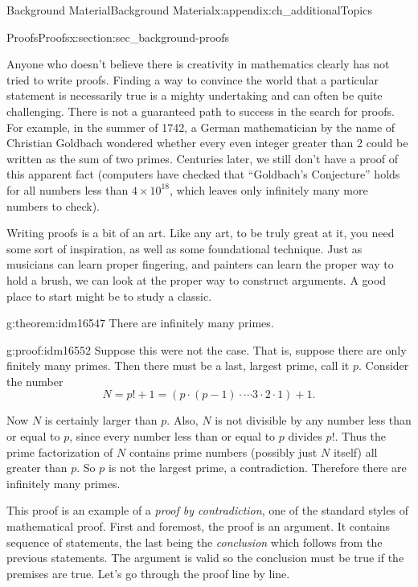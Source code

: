 \documentclass[oneside,10pt,]{book}
\numberwithin{equation}{chapter}
\begin{document}
\begin{appendixptx}{Background Material}{}{Background Material}{}{}{x:appendix:ch_additionalTopics}
\begin{sectionptx}{Proofs}{}{Proofs}{}{}{x:section:sec_background-proofs}
\begin{introduction}{}
Anyone who doesn't believe there is creativity in mathematics clearly has not tried to write proofs. Finding a way to convince the world that a particular statement is necessarily true is a mighty undertaking and can often be quite challenging. There is not a guaranteed path to success in the search for proofs. For example, in the summer of 1742, a German mathematician by the name of Christian Goldbach wondered whether every even integer greater than 2 could be written as the sum of two primes. Centuries later, we still don't have a proof of this apparent fact (computers have checked that ``Goldbach's Conjecture'' holds for all numbers less than \(4\times 10^{18}\), which leaves only infinitely many more numbers to check).%
\par
Writing proofs is a bit of an art. Like any art, to be truly great at it, you need some sort of inspiration, as well as some foundational technique. Just as musicians can learn proper fingering, and painters can learn the proper way to hold a brush, we can look at the proper way to construct arguments. A good place to start might be to study a classic.%
\begin{theorem}{}{}{g:theorem:idm16547}%
There are infinitely many primes.%
\end{theorem}
\begin{proofptx}{}{g:proof:idm16552}
Suppose this were not the case. That is, suppose there are only finitely many primes. Then there must be a last, largest prime, call it \(p\). Consider the number%
\begin{equation*}
N = p! + 1 = (p \cdot (p-1) \cdot \cdots 3\cdot 2 \cdot 1) + 1.
\end{equation*}
%
\par
Now \(N\) is certainly larger than \(p\). Also, \(N\) is not divisible by any number less than or equal to \(p\), since every number less than or equal to \(p\) divides \(p!\). Thus the prime factorization of \(N\) contains prime numbers (possibly just \(N\) itself) all greater than \(p\). So \(p\) is not the largest prime, a contradiction. Therefore there are infinitely many primes.%
\end{proofptx}
This proof is an example of a \emph{proof by contradiction}, one of the standard styles of mathematical proof. First and foremost, the proof is an argument. It contains sequence of statements, the last being the \emph{conclusion} which follows from the previous statements. The argument is valid so the conclusion must be true if the premises are true. Let's go through the proof line by line.%

\end{introduction}
\end{sectionptx}
\end{appendixptx}
\end{document}

